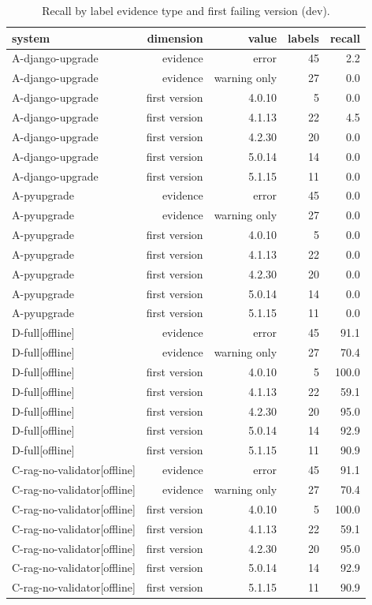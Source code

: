 \begin{table}[t]
\centering
\small
\caption{Recall by label evidence type and first failing version (dev).}
\label{tab:breakdown-dev}
\begin{tabular}{lrrrr}
\toprule
system & dimension & value & labels & recall \\
\midrule
A-django-upgrade & evidence & error & 45 & 2.2 \\
A-django-upgrade & evidence & warning only & 27 & 0.0 \\
A-django-upgrade & first version & 4.0.10 & 5 & 0.0 \\
A-django-upgrade & first version & 4.1.13 & 22 & 4.5 \\
A-django-upgrade & first version & 4.2.30 & 20 & 0.0 \\
A-django-upgrade & first version & 5.0.14 & 14 & 0.0 \\
A-django-upgrade & first version & 5.1.15 & 11 & 0.0 \\
A-pyupgrade & evidence & error & 45 & 0.0 \\
A-pyupgrade & evidence & warning only & 27 & 0.0 \\
A-pyupgrade & first version & 4.0.10 & 5 & 0.0 \\
A-pyupgrade & first version & 4.1.13 & 22 & 0.0 \\
A-pyupgrade & first version & 4.2.30 & 20 & 0.0 \\
A-pyupgrade & first version & 5.0.14 & 14 & 0.0 \\
A-pyupgrade & first version & 5.1.15 & 11 & 0.0 \\
D-full[offline] & evidence & error & 45 & 91.1 \\
D-full[offline] & evidence & warning only & 27 & 70.4 \\
D-full[offline] & first version & 4.0.10 & 5 & 100.0 \\
D-full[offline] & first version & 4.1.13 & 22 & 59.1 \\
D-full[offline] & first version & 4.2.30 & 20 & 95.0 \\
D-full[offline] & first version & 5.0.14 & 14 & 92.9 \\
D-full[offline] & first version & 5.1.15 & 11 & 90.9 \\
C-rag-no-validator[offline] & evidence & error & 45 & 91.1 \\
C-rag-no-validator[offline] & evidence & warning only & 27 & 70.4 \\
C-rag-no-validator[offline] & first version & 4.0.10 & 5 & 100.0 \\
C-rag-no-validator[offline] & first version & 4.1.13 & 22 & 59.1 \\
C-rag-no-validator[offline] & first version & 4.2.30 & 20 & 95.0 \\
C-rag-no-validator[offline] & first version & 5.0.14 & 14 & 92.9 \\
C-rag-no-validator[offline] & first version & 5.1.15 & 11 & 90.9 \\
\bottomrule
\end{tabular}
\end{table}
